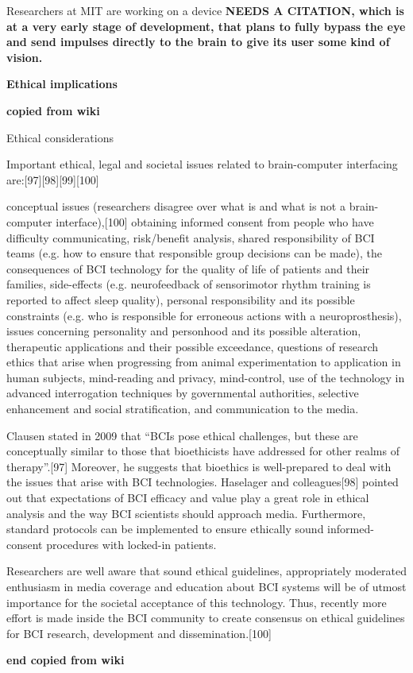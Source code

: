 Researchers at MIT are working on a device \bf{NEEDS A CITATION}, which is at a very early stage of development, that plans to fully bypass the eye and send impulses directly to the brain to give its user some kind of vision.

\bf{Ethical implications}


\bf{copied from wiki} 

Ethical considerations

Important ethical, legal and societal issues related to brain-computer interfacing are:[97][98][99][100]

    conceptual issues (researchers disagree over what is and what is not a brain-computer interface),[100]
    obtaining informed consent from people who have difficulty communicating,
    risk/benefit analysis,
    shared responsibility of BCI teams (e.g. how to ensure that responsible group decisions can be made),
    the consequences of BCI technology for the quality of life of patients and their families,
    side-effects (e.g. neurofeedback of sensorimotor rhythm training is reported to affect sleep quality),
    personal responsibility and its possible constraints (e.g. who is responsible for erroneous actions with a neuroprosthesis),
    issues concerning personality and personhood and its possible alteration,
    therapeutic applications and their possible exceedance,
    questions of research ethics that arise when progressing from animal experimentation to application in human subjects,
    mind-reading and privacy,
    mind-control,
    use of the technology in advanced interrogation techniques by governmental authorities,
    selective enhancement and social stratification, and
    communication to the media.

Clausen stated in 2009 that “BCIs pose ethical challenges, but these are conceptually similar to those that bioethicists have addressed for other realms of therapy”.[97] Moreover, he suggests that bioethics is well-prepared to deal with the issues that arise with BCI technologies. Haselager and colleagues[98] pointed out that expectations of BCI efficacy and value play a great role in ethical analysis and the way BCI scientists should approach media. Furthermore, standard protocols can be implemented to ensure ethically sound informed-consent procedures with locked-in patients.

Researchers are well aware that sound ethical guidelines, appropriately moderated enthusiasm in media coverage and education about BCI systems will be of utmost importance for the societal acceptance of this technology. Thus, recently more effort is made inside the BCI community to create consensus on ethical guidelines for BCI research, development and dissemination.[100]


\bf{end copied from wiki} 
